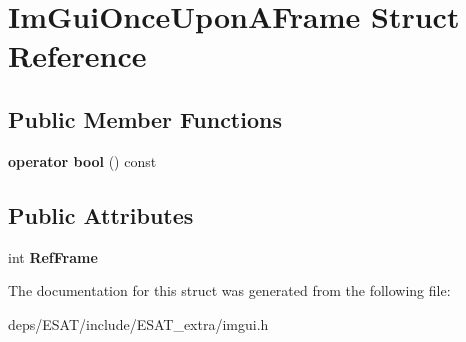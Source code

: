 \hypertarget{struct_im_gui_once_upon_a_frame}{}\section{Im\+Gui\+Once\+Upon\+A\+Frame Struct Reference}
\label{struct_im_gui_once_upon_a_frame}
\subsection*{Public Member Functions}
\begin{DoxyCompactItemize}
\item 
\mbox{\label{struct_im_gui_once_upon_a_frame_a3c912b79bc333ce746356001431c2504}} 
{\bfseries operator bool} () const
\end{DoxyCompactItemize}
\subsection*{Public Attributes}
\begin{DoxyCompactItemize}
\item 
\mbox{\label{struct_im_gui_once_upon_a_frame_a2d44776b8e7bdeec217f88be9f832e08}} 
int {\bfseries Ref\+Frame}
\end{DoxyCompactItemize}


The documentation for this struct was generated from the following file\+:\begin{DoxyCompactItemize}
\item 
deps/\+E\+S\+A\+T/include/\+E\+S\+A\+T\+\_\+extra/imgui.\+h\end{DoxyCompactItemize}
